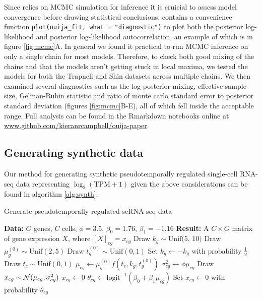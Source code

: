 Since \sname relies on MCMC simulation for inference it is cruicial to assess model convergence before drawing statistical conclusions. \sname contains a convenience function \texttt{plot(ouija\_fit, what = "diagnostic")} to plot both the posterior log-likelihood and posterior log-likelihood autocorrelation, an example of which is in figure \ref{fig:mcmc}A. In general we found it practical to run MCMC inference on only a single chain for most models. Therefore, to check both good mixing of the chains and that the models aren't getting stuck in local maxima, we tested the models for both the Trapnell and Shin datasets across multiple chains. We then examined several diagnostics such as the log-posterior mixing, effective sample size, Gelman-Rubin statistic and ratio of monte carlo standard error to posterior standard deviation (figures \ref{fig:mcmc}B-E), all of which fell inside the acceptable range. Full analysis can be found in the Rmarkdown notebooks online at \url{www.github.com/kieranrcampbell/ouija-paper}.

\subsection{Generating synthetic data}

Our method for generating synthetic pseudotemporally regulated single-cell RNA-seq data representing $\log_2(\text{TPM} + 1)$ given the above considerations can be found in algorithm \ref{alg:synth}.

\begin{algorithm}                      %
\caption{Generate pseudotemporally regulated scRNA-seq data}          %
\label{alg:synth}                           %
\begin{algorithmic}[1]                    %
\State \textbf{Data:} $G$ genes, $C$ cells, $\phi = 3.5$, $\beta_0 = 1.76$, $\beta_1 = -1.16$
\State \textbf{Result:} A $C \times G$ matrix of gene expression $X$, where $[X]_{cg} = x_{cg}$
	\State Draw $k_g \sim \text{Unif(5, 10)}$
	\State Draw $\mu_g^{(0)} \sim \text{Unif}(2, 5)$
	\State Draw $t_g^{(0)} \sim \text{Unif}(0,1)$
	\State Set $k_g \gets -k_g$ with probability $\frac{1}{2}$
		\State Draw $t_c \sim \text{Unif}(0,1)$
		\State $\mu_{cg} \gets \mu_g^{(0)} f(t_c, k_g, t_g^{(0)})$
		\State $\sigma^2_{cg} \gets \phi \mu_{cg}$
		\State Draw $x_{cg} \sim \mathcal{N}(\mu_{cg}, \sigma_{cg}^2)$
			\State $x_{cg} \gets 0$
		\EndIf
		\State $\theta_{cg} \gets \text{logit}^{-1}(\beta_0 + \beta_1 \mu_{cg})$
		\State Set $x_{cg} \gets 0$ with probability $\theta_{cg}$
	\EndFor
\EndFor
\end{algorithmic}
\end{algorithm}

